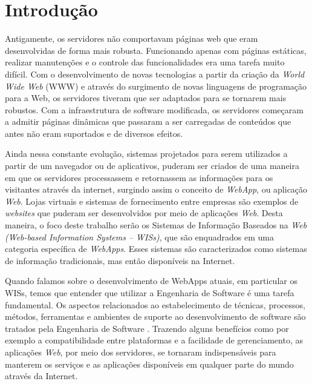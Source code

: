 
\section{Introdução}
\label{sec-intro}


Antigamente, os servidores não comportavam páginas web que eram desenvolvidas de forma mais robusta. Funcionando apenas com páginas estáticas, realizar manutenções e o controle das funcionalidades era uma tarefa muito difícil. Com o desenvolvimento de novas tecnologias a partir da criação da \textit{World Wide Web} (WWW) e através do surgimento de novas linguagens de programação para a Web, os servidores tiveram que ser adaptados para se tornarem mais robustos. Com a infraestrutura de software modificada, os servidores começaram a admitir páginas dinâmicas que passaram a ser carregadas de conteúdos que antes não eram suportados e de diversos efeitos.

Ainda nessa constante evolução, sistemas projetados para serem utilizados a partir de um navegador ou de aplicativos, puderam ser criados de uma maneira em que os servidores processassem e retornassem as informações para os visitantes através da internet, surgindo assim o conceito de \textit{WebApp}, ou aplicação \textit{Web}. Lojas virtuais e sistemas de fornecimento entre empresas são exemplos de \textit{websites} que puderam ser desenvolvidos por meio de aplicações \textit{Web}. Desta maneira, o foco deste trabalho serão os Sistemas de Informação Baseados na \textit{Web (Web-based Information Systems – WISs)}, que são enquadrados em uma categoria específica de \textit{WebApps}. Esses sistemas são caracterizados como sistemas de informação tradicionais, mas então disponíveis na Internet.

Quando falamos sobre o desenvolvimento de WebApps atuais, em particular os WISs, temos que entender que utilizar a Engenharia de Software é uma tarefa fundamental. Os aspectos relacionados ao estabelecimento de técnicas, processos, métodos, ferramentas e ambientes de suporte ao desenvolvimento de software são tratados pela Engenharia de Software \cite{falbo:es14}. Trazendo alguns benefícios como por exemplo a compatibilidade entre plataformas e a facilidade de gerenciamento, as aplicações \textit{Web}, por meio dos servidores, se tornaram indispensáveis para manterem os serviços e as aplicações disponíveis em qualquer parte do mundo através da Internet.

